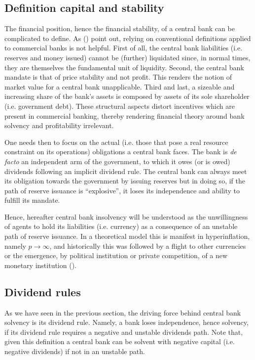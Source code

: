 \documentclass[american]{scrartcl}
\newcommand{\citein}[1]{\citeauthor{#1} (\citeyear{#1})}
\begin{document}
\subsection{Definition capital and stability}

The financial position, hence the financial stability, of a central bank can be complicated to define. As \citein{Hall2015} point out, relying on conventional definitions applied to commercial banks is not helpful. First of all, the central bank liabilities (i.e. reserves and money issued) cannot be (further) liquidated since, in normal times, they are themselves the fundamental unit of liquidity. Second, the central bank mandate is that of price stability and not profit. This renders the notion of market value for a central bank unapplicable. Third and last, a sizeable and increasing share of the bank's assets is composed by assets of its sole shareholder (i.e. government debt). These structural aspects distort incentives which are present in commercial banking, thereby rendering financial theory around bank solvency and profitability irrelevant.

One needs then to focus on the actual (i.e. those that pose a real resource constraint on its operations) obligations a central bank faces. The bank is \textit{de facto} an independent arm of the government, to which it owes (or is owed) dividends following an implicit dividend rule. The central bank can always meet its obligation towards the government by issuing reserves but in doing so, if the path of reserve issuance is ``explosive'', it loses its independence and ability to fulfill its mandate. %

Hence, hereafter central bank insolvency will be understood as the unwillingness of agents to hold its liabilities (i.e. currency) as a consequence of an unstable path of reserve issuance. In a theoretical model this is manifest in hyperinflation, namely $p \xrightarrow{} \infty$, and historically this was followed by a flight to other currencies or the emergence, by political institution or private competition, of a new monetary institution (\cite{Flandreau2007}). %

\subsection{Dividend rules}

As we have seen in the previous section, the driving force behind central bank solvency is its dividend rule. Namely, a bank loses independence, hence solvency, if its dividend rule requires a negative and unstable dividends path. Note that, given this definition a central bank can be solvent with negative capital (i.e. negative dividends) if not in an unstable path.
\end{document}
